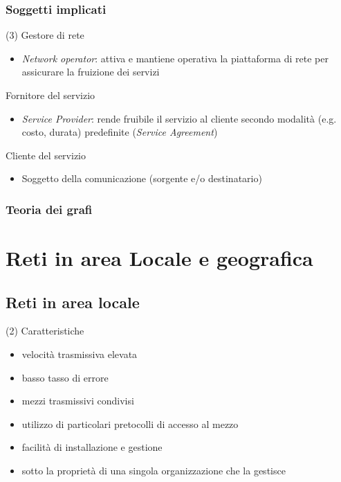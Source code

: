 \documentclass{book}
\begin{document}
\subsection{Soggetti implicati}
\begin{tasks}(3)
	\task Gestore di rete
	\begin{itemize}
		\item \textit{Network operator}: attiva e mantiene operativa la
			piattaforma di rete per assicurare la fruizione dei servizi
	\end{itemize}
	\task Fornitore del servizio
	\begin{itemize}
		\item \textit{Service Provider}: rende fruibile il servizio al cliente
			secondo modalità (e.g. costo, durata) predefinite (\textit{Service
			Agreement})
	\end{itemize}
	\task Cliente del servizio
	\begin{itemize}
		\item Soggetto della comunicazione (sorgente e/o destinatario)
	\end{itemize}
\end{tasks}
\subsection{Teoria dei grafi}



\chapter{Reti in area Locale e geografica}
\section{Reti in area locale}
\begin{tasks}(2)
	\task Caratteristiche
	\begin{itemize}
		\item velocità trasmissiva elevata
		\item basso tasso di errore
		\item mezzi trasmissivi condivisi
		\item utilizzo di particolari pretocolli di accesso al mezzo
		\item facilità di installazione e gestione
		\item sotto la proprietà di una singola organizzazione che la gestisce
	\end{itemize}
\end{tasks}
\end{document}
